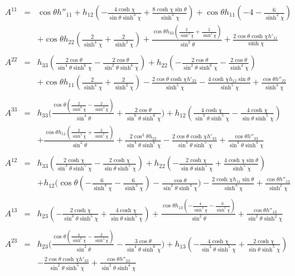 \documentclass[10pt,letterpaper]{article}
\numberwithin{equation}{section}
\begin{document}
\begin{eqnarray}
A^{11}&=& \cos\theta h''_{11} + h_{12} (- \frac{4 \cosh\chi}{\sin\theta \sinh^3\chi} + \frac{8 \cosh\chi \sin\theta}{\sinh^3\chi}) + \cos\theta h_{11} (-4 -  \frac{6}{\sinh^2\chi}) \nonumber \\ 
&& + \cos\theta h_{22} (\frac{2}{\sinh^4\chi} + \frac{2}{\sinh^2\chi}) + \frac{\cos\theta h_{33} (\frac{2}{\sinh^4\chi} + \frac{2}{\sinh^2\chi})}{\sin^2\theta} + \frac{2 \cos\theta \cosh\chi h'_{11}}{\sinh\chi}
\\  \nonumber\\ 
A^{22}&=& h_{33} (\frac{2 \cos\theta}{\sin^4\theta \sinh^6\chi} -  \frac{2 \cos\theta}{\sin^2\theta \sinh^6\chi}) + h_{22} (- \frac{2 \cos\theta}{\sin^2\theta \sinh^6\chi} -  \frac{2 \cos\theta}{\sinh^4\chi}) \nonumber \\ 
&& + \cos\theta h_{11} (\frac{2}{\sinh^4\chi} + \frac{2}{\sinh^2\chi}) -  \frac{2 \cos\theta \cosh\chi h'_{22}}{\sinh^5\chi} -  \frac{4 \cosh\chi h_{12} \sin\theta}{\sinh^5\chi} + \frac{\cos\theta h''_{22}}{\sinh^4\chi}
\\  \nonumber\\ 
A^{33}&=& h_{33} \bigl(\frac{\cos\theta (\frac{2}{\sinh^6\chi} -  \frac{2}{\sinh^4\chi})}{\sin^4\theta} + \frac{2 \cos\theta}{\sin^6\theta \sinh^6\chi}\bigr) + h_{12} (\frac{4 \cosh\chi}{\sin^3\theta \sinh^5\chi} -  \frac{4 \cosh\chi}{\sin\theta \sinh^5\chi}) \nonumber \\ 
&& + \frac{\cos\theta h_{11} (\frac{2}{\sinh^4\chi} + \frac{2}{\sinh^2\chi})}{\sin^2\theta} + \frac{2 \cos^3\theta h_{22}}{\sin^4\theta \sinh^6\chi} -  \frac{2 \cos\theta \cosh\chi h'_{33}}{\sin^4\theta \sinh^5\chi} + \frac{\cos\theta h''_{33}}{\sin^4\theta \sinh^4\chi}
\\  \nonumber\\ 
A^{12}&=& h_{33} (\frac{2 \cosh\chi}{\sin^3\theta \sinh^5\chi} -  \frac{2 \cosh\chi}{\sin\theta \sinh^5\chi}) + h_{22} (- \frac{2 \cosh\chi}{\sin\theta \sinh^5\chi} + \frac{4 \cosh\chi \sin\theta}{\sinh^5\chi}) \nonumber \\ 
&& + h_{12} \bigl(\cos\theta (- \frac{6}{\sinh^4\chi} -  \frac{6}{\sinh^2\chi}) -  \frac{\cos\theta}{\sin^2\theta \sinh^4\chi}\bigr) -  \frac{2 \cosh\chi h_{11} \sin\theta}{\sinh^3\chi} + \frac{\cos\theta h''_{12}}{\sinh^2\chi}
\\  \nonumber\\ 
A^{13}&=& h_{23} (- \frac{2 \cosh\chi}{\sin^3\theta \sinh^5\chi} + \frac{4 \cosh\chi}{\sin\theta \sinh^5\chi}) + \frac{\cos\theta h_{13} (- \frac{4}{\sinh^4\chi} -  \frac{6}{\sinh^2\chi})}{\sin^2\theta} + \frac{\cos\theta h''_{13}}{\sin^2\theta \sinh^2\chi}
\\  \nonumber\\ 
A^{23}&=& h_{23} \bigl(\frac{\cos\theta (\frac{4}{\sinh^6\chi} -  \frac{2}{\sinh^4\chi})}{\sin^2\theta} -  \frac{3 \cos\theta}{\sin^4\theta \sinh^6\chi}\bigr) + h_{13} (- \frac{4 \cosh\chi}{\sin^3\theta \sinh^5\chi} + \frac{2 \cosh\chi}{\sin\theta \sinh^5\chi}) \nonumber \\ 
&& -  \frac{2 \cos\theta \cosh\chi h'_{23}}{\sin^2\theta \sinh^5\chi} + \frac{\cos\theta h''_{23}}{\sin^2\theta \sinh^4\chi}
\end{eqnarray}
\end{document}
